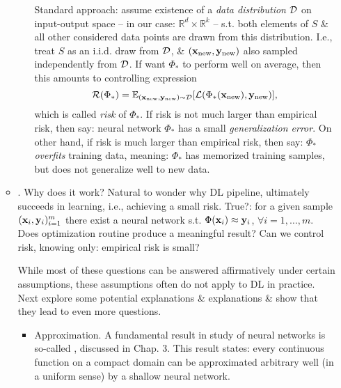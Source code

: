 \documentclass{article}
\begin{document}
\begin{itemize}
\begin{itemize}
\begin{itemize}
			Standard approach: assume existence of a {\it data distribution} ${\cal D}$ on input-output space -- in our case: $\mathbb{R}^d\times\mathbb{R}^k$ -- s.t. both elements of $S$ \& all other considered data points are drawn from this distribution. I.e., treat $S$ as an i.i.d. draw from ${\cal D}$, \& $({\bf x}_{\rm new},{\bf y}_{\rm new})$ also sampled independently from ${\cal D}$. If want $\Phi_*$ to perform well on average, then this amounts to controlling expression
			\begin{equation}
				{\cal R}(\Phi_*) = \mathbb{E}_{({\bf x}_{\rm new},{\bf y}_{\rm new})\sim{\cal D}} [{\cal L}(\Phi_*({\bf x}_{\rm new}),{\bf y}_{\rm new})],
			\end{equation}
			which is called {\it risk} of $\Phi_*$. If risk is not much larger than empirical risk, then say: neural network $\Phi_*$ has a small {\it generalization error}. On other hand, if risk is much larger than empirical risk, then say: $\Phi_*$ {\it overfits} training data, meaning: $\Phi_*$ has memorized training samples, but does not generalize well to new data.
		\end{itemize}
		\item {. Why does it work?} Natural to wonder why DL pipeline, ultimately succeeds in learning, i.e., achieving a small risk. True?: for a given sample $({\bf x}_i,{\bf y}_i)_{i=1}^m$ there exist a neural network s.t. $\Phi({\bf x}_i)\approx{\bf y}_i$, $\forall i = 1,\ldots,m$. Does optimization routine produce a meaningful result? Can we control risk, knowing only: empirical risk is small?

		While most of these questions can be answered affirmatively under certain assumptions, these assumptions often do not apply to DL in practice. Next explore some potential explanations \& explanations \& show that they lead to even more questions.
		\begin{itemize}
			\item {\sf Approximation.} A fundamental result in study of neural networks is so-called , discussed in Chap. 3. This result states: every continuous function on a compact domain can be approximated arbitrary well (in a uniform sense) by a shallow neural network.


\end{itemize}
\end{itemize}
\end{itemize}
\end{document}
